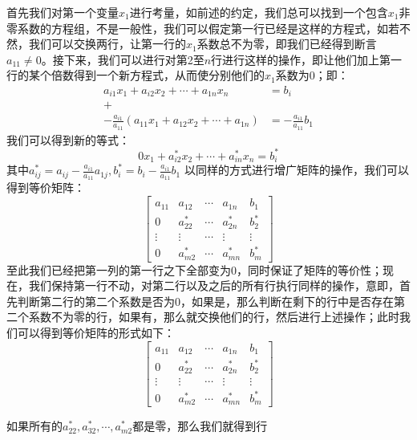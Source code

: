 \documentclass[a4paper,12pt]{ctexart}
\begin{document}
	\indent
	首先我们对第一个变量$x_1$进行考量，如前述的约定，我们总可以找到一个包含$x_1$非零系数的方程组，不是一般性，我们可以假定第一行已经是这样的方程式，如若不然，我们可以交换两行，让第一行的$x_1$系数总不为零，即我们已经得到断言$a_11 \neq 0$。接下来，我们可以进行对第2至$n$行进行这样的操作，即让他们加上第一行的某个倍数得到一个新方程式，从而使分别他们的$x_1$系数为0；即：
	\begin{align*}
	a_{i1}x_1+a_{i2}x_2 + \cdots + a_{1n}x_n &= b_i\\
	+\\
	-\frac{a_{i1}}{a_{11}}(a_{11}x_1+a_{12}x_2+\cdots+a_{1n}) &= -\frac{a_{i1}}{a_{11}}b_1
	\end{align*}
	我们可以得到新的等式：
	$$
	0{x_1}+a_{i2}^*x_2+\cdots+a_{in}^*x_n = b_i^*
	$$
	其中$a_{ij}^*=a_{ij}-\frac{a_{i1}}{a_{11}}a_{1j},b_i^*=b_i-\frac{a_{i1}}{a_{11}}b_1$
	以同样的方式进行增广矩阵的操作，我们可以得到等价矩阵：
	$$
		\left[
		\begin{array}{ccccc}
		a_{11} 	& a_{12} & \cdots & a_{1n} & b_1 \\
		0 		& a_{22}^* & \cdots & a_{2n}^* & b_2^* \\
		\vdots 	& \vdots & \cdots & \vdots & \vdots\\
		0 		& a_{m2}^* & \cdots & a_{mn}^* & b_m^*
		\end{array}
		\right]
	$$
	至此我们已经把第一列的第一行之下全部变为0，同时保证了矩阵的等价性；现在，我们保持第一行不动，对第二行以及之后的所有行执行同样的操作，意即，首先判断第二行的第二个系数是否为0，如果是，那么判断在剩下的行中是否存在第二个系数不为零的行，如果有，那么就交换他们的行，然后进行上述操作；此时我们可以得到等价矩阵的形式如下：
	$$
		\left[
		\begin{array}{ccccc}
		a_{11} 	& a_{12} & \cdots & a_{1n} & b_1 \\
		0 		& a_{22}^* & \cdots & a_{2n}^* & b_2^* \\
		\vdots 	& \vdots & \cdots & \vdots & \vdots\\
		0 		& a_{m2}^* & \cdots & a_{mn}^* & b_m^*
		\end{array}
		\right]
	$$
	
	如果所有的$a_{22}^*,a_{32}^*,\cdots,a_{m2}^*$都是零，那么我们就得到行
\end{document}
